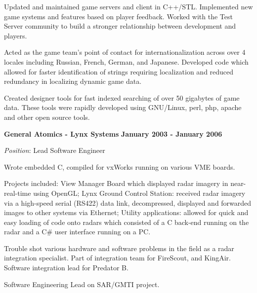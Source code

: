\documentclass{article}
\begin{document}
\vspace{\baselineskip}
Updated and maintained game servers and client in C++/STL.  Implemented new 
game systems and features based on player feedback.  Worked with the Test Server 
community to build a stronger relationship between development and players.
\par

\vspace{\baselineskip}
Acted as the game team's point of contact for internationalization across over 4
locales including Russian, French, German, and Japanese.  Developed code which
allowed for faster identification of strings requiring localization and reduced 
redundancy in localizing dynamic game data.
\par

\vspace{\baselineskip}
Created designer tools for fast indexed searching of over 
50 gigabytes of game data.  These tools were rapidly developed using GNU/Linux, 
perl, php, apache and other open source tools.
\par
\vspace{\baselineskip}

\vspace{\baselineskip}
{\bf General Atomics - Lynx Systems} 
\hfill {\bf January 2003 - January 2006} 
\par
{\it Position}: Lead Software Engineer
\vspace{\baselineskip}
\par
Wrote embedded C, compiled for vxWorks running on various VME boards.  
\par
Projects included: View Manager Board which displayed radar imagery in near-real-time
using OpenGL; Lynx Ground Control Station: received radar imagery via a
high-speed serial (RS422) data link, decompressed, displayed and forwarded
images to other systems via Ethernet; Utility applications: allowed for
quick and easy loading of code onto radars which consisted of a C back-end
running on the radar and a C\# user interface running on a PC.  
\par

\vspace{\baselineskip}
Trouble shot various hardware and software problems in the field as a radar
integration specialist.  Part of integration team for FireScout, and KingAir.
Software integration lead for Predator B.
\par

\vspace{\baselineskip}
Software Engineering Lead on SAR/GMTI project.
\end{document}
